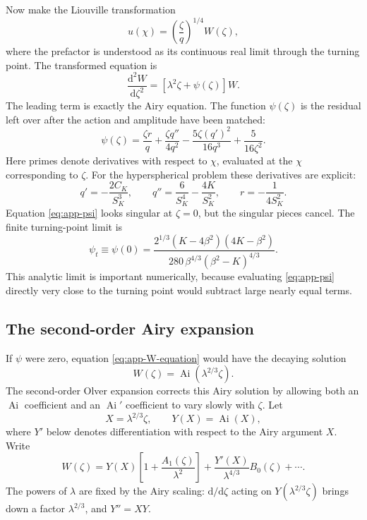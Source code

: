 \documentclass[11pt,a4paper]{article}
\newcommand{\dd}{\mathrm{d}}
\newcommand{\SK}{S_K}
\newcommand{\CK}{C_K}
\newcommand{\Ai}{\operatorname{Ai}}
\begin{document}
Now make the Liouville transformation
\begin{equation}
  u(\chi)=\left(\frac{\zeta}{q}\right)^{1/4}W(\zeta),
  \label{eq:app-liouville-transform}
\end{equation}
where the prefactor is understood as its continuous real limit through the
turning point.  The transformed equation is
\begin{equation}
  \frac{\dd^2 W}{\dd\zeta^2}
  =\left[\lambda^2\zeta+\psi(\zeta)\right]W.
  \label{eq:app-W-equation}
\end{equation}
The leading term is exactly the Airy equation.  The function
\(\psi(\zeta)\) is the residual left over after the action and amplitude have
been matched:
\begin{equation}
  \psi(\zeta)=
  \frac{\zeta r}{q}
  +\frac{\zeta q''}{4q^2}
  -\frac{5\zeta(q')^2}{16q^3}
  +\frac{5}{16\zeta^2}.
  \label{eq:app-psi}
\end{equation}
Here primes denote derivatives with respect to \(\chi\), evaluated at the
\(\chi\) corresponding to \(\zeta\).  For the hyperspherical problem these
derivatives are explicit:
\begin{equation}
  q'=-\frac{2\CK}{\SK^3},\qquad
  q''=\frac{6}{\SK^4}-\frac{4K}{\SK^2},\qquad
  r=-\frac{1}{4\SK^2}.
  \label{eq:app-q-derivatives}
\end{equation}
Equation \eqref{eq:app-psi} looks singular at \(\zeta=0\), but the singular
pieces cancel.  The finite turning-point limit is
\begin{equation}
  \psi_t\equiv\psi(0)=
  \frac{2^{1/3}(K-4\beta^2)(4K-\beta^2)}
  {280\,\beta^{4/3}(\beta^2-K)^{4/3}}.
  \label{eq:app-psi-turn}
\end{equation}
This analytic limit is important numerically, because evaluating
\eqref{eq:app-psi} directly very close to the turning point would subtract
large nearly equal terms.

\subsection{The second-order Airy expansion}

If \(\psi\) were zero, equation \eqref{eq:app-W-equation} would have the
decaying solution
\begin{equation}
  W(\zeta)=\Ai(\lambda^{2/3}\zeta).
\end{equation}
The second-order Olver expansion corrects this Airy solution by allowing both
an \(\Ai\) coefficient and an \(\Ai'\) coefficient to vary slowly with
\(\zeta\).  Let
\begin{equation}
  X=\lambda^{2/3}\zeta,\qquad Y(X)=\Ai(X),
\end{equation}
where \(Y'\) below denotes differentiation with respect to the Airy argument
\(X\).  Write
\begin{equation}
  W(\zeta)=
  Y(X)\left[1+\frac{A_1(\zeta)}{\lambda^2}\right]
  +\frac{Y'(X)}{\lambda^{4/3}}B_0(\zeta)
  +\cdots .
  \label{eq:app-second-ansatz}
\end{equation}
The powers of \(\lambda\) are fixed by the Airy scaling:
\(\dd/\dd\zeta\) acting on \(Y(\lambda^{2/3}\zeta)\) brings down a factor
\(\lambda^{2/3}\), and \(Y''=XY\).
\end{document}

